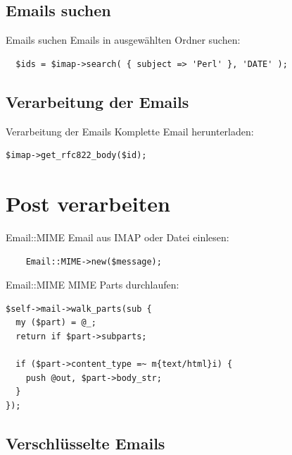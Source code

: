 \subsection{Emails suchen}

\begin{frame}[fragile]{Emails suchen}
  Emails in ausgewählten Ordner suchen:

\begin{verbatim}
  $ids = $imap->search( { subject => 'Perl' }, 'DATE' );
\end{verbatim}
\end{frame}

\subsection{Verarbeitung der Emails}

\begin{frame}[fragile]{Verarbeitung der Emails}
  Komplette Email herunterladen:

\begin{verbatim}
$imap->get_rfc822_body($id);
\end{verbatim}
\end{frame}

\section{Post verarbeiten}

\begin{frame}[fragile]{Email::MIME}
  Email aus IMAP oder Datei einlesen:

  \begin{verbatim}
    Email::MIME->new($message);
  \end{verbatim}

\end{frame}

\begin{frame}[fragile]{Email::MIME}
MIME Parts durchlaufen:

\begin{verbatim}
$self->mail->walk_parts(sub {
  my ($part) = @_;
  return if $part->subparts;

  if ($part->content_type =~ m{text/html}i) {
    push @out, $part->body_str;
  }
});
\end{verbatim}
\end{frame}

\subsection{Verschlüsselte Emails}

